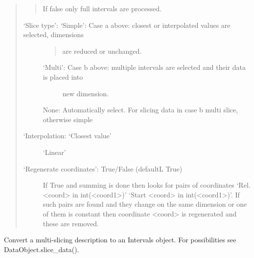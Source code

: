 \documentclass[letterpaper,10pt,english]{sphinxmanual}
\begin{document}
\begin{fulllineitems}
\begin{fulllineitems}
\begin{quote}
\begin{description}
\begin{quote}
If false only full intervals are processed.
\end{quote}
\begin{description}
\item[{‘Slice type’: ‘Simple’: Case a above: closest or interpolated values are selected, dimensions}] \leavevmode\begin{quote}

are reduced or unchanged.
\end{quote}
\begin{description}
\item[{‘Multi’: Case b above: multiple intervals are selected and their data is placed into}] \leavevmode
new dimension.

\end{description}

None: Automatically select. For slicing data in case b multi slice, otherwise simple

\item[{‘Interpolation: ‘Closest value’}] \leavevmode
‘Linear’

\item[{‘Regenerate coordinates’: True/False  (defaultL True)}] \leavevmode
If True and summing is done then looks for pairs of coordinates
‘Rel. \textless{}coord\textgreater{} in int(\textless{}coord1\textgreater{})’  ‘Start \textless{}coord\textgreater{} in int(\textless{}coord1\textgreater{})’.
If such pairs are found and they change on the same dimension or one of them is constant then
coordinate \textless{}coord\textgreater{} is regenerated and these are removed.

\end{description}

\end{description}
\end{quote}

\end{fulllineitems}


\begin{fulllineitems}
\label{\detokenize{data_object:flap.data_object.DataObject.slicing_to_intervals}}
Convert a multi-slicing description to an Intervals object.
For possibilities see DataObject.slice\_data().


\end{fulllineitems}
\end{fulllineitems}
\end{document}

